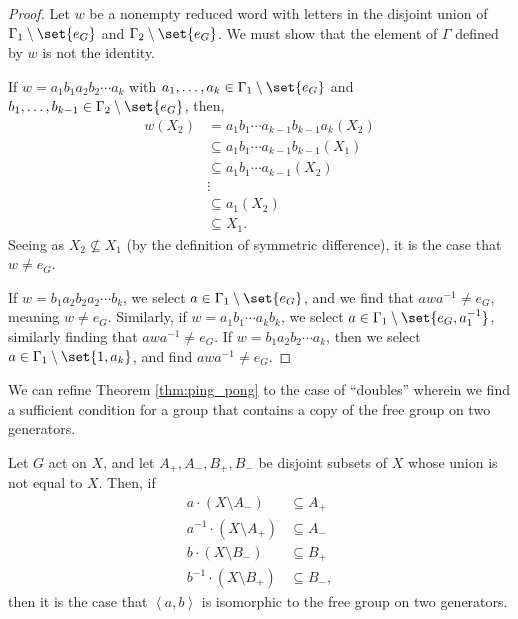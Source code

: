\begin{proof}
  Let $w$ be a nonempty reduced word with letters in the disjoint union of $\Gamma_1\setminus \set{e_G}$ and $\Gamma_2\setminus \set{e_G}$. We must show that the element of $\Gamma$ defined by $w$ is not the identity.\newline

  If $w = a_1b_1a_2b_2\cdots a_k$ with $a_1,\dots,a_k\in \Gamma_1\setminus \set{e_G}$ and $b_1,\dots,b_{k-1}\in \Gamma_{2}\setminus \set{e_G}$, then,
  \begin{align*}
    w\left(X_2\right) &= a_1b_1\cdots a_{k-1}b_{k-1}a_k\left(X_2\right)\\
                      &\subseteq a_1b_1\cdots a_{k-1}b_{k-1}\left(X_1\right)\\
                      &\subseteq a_1b_1\cdots a_{k-1}\left(X_2\right)\\
                      &\vdots\\
                      &\subseteq a_1\left(X_2\right)\\
                      &\subseteq X_1.
  \end{align*}
  Seeing as $X_2\nsubseteq X_1$ (by the definition of symmetric difference), it is the case that $w\neq e_{G}$.\newline

  If $w = b_1a_2b_2a_2\cdots b_k$, we select $a\in \Gamma_1\setminus \set{e_G}$, and we find that $awa^{-1}\neq e_G$, meaning $w\neq e_G$. Similarly, if $w = a_1b_1\cdots a_kb_k$, we select $a\in \Gamma_1\setminus \set{e_G,a_{1}^{-1}}$, similarly finding that $awa^{-1}\neq e_{G}$. If $w = b_1a_2b_2\cdots a_k$, then we select $a\in \Gamma_1\setminus \set{1,a_k}$, and find $awa^{-1}\neq e_G$.
\end{proof}
We can refine Theorem \ref{thm:ping_pong} to the case of ``doubles'' wherein we find a sufficient condition for a group that contains a copy of the free group on two generators.
\begin{corollary}\label{corollary:ping_pong_doubles}
  Let $G$ act on $X$, and let $A_{+}, A_{-},B_{+},B_{-}$ be disjoint subsets of $X$ whose union is not equal to $X$. Then, if
  \begin{align*}
    a\cdot \left(X\setminus A_{-}\right) &\subseteq A_{+}\\
    a^{-1}\cdot \left(X\setminus A_{+}\right) &\subseteq A_{-}\\
    b\cdot \left(X\setminus B_{-}\right) &\subseteq B_{+}\\
    b^{-1}\cdot \left(X\setminus B_{+}\right) &\subseteq B_{-},
  \end{align*}
  then it is the case that $\left\langle a,b \right\rangle$ is isomorphic to the free group on two generators.
\end{corollary}
